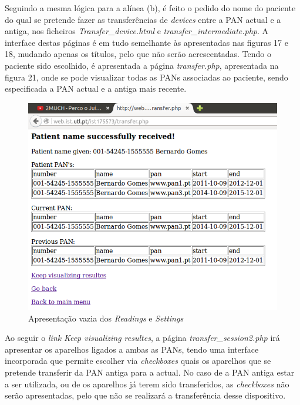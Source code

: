 \documentclass[a4paper]{article}
\begin{document}
\pagebreak
Seguindo a mesma lógica para a alínea (b), é feito o pedido do nome do paciente do qual se pretende fazer as transferências de \textit{devices} entre a PAN actual e a antiga, nos ficheiros \textit{Transfer\_device.html} e \textit{transfer\_intermediate.php}. A interface destas páginas é em tudo semelhante às apresentadas nas figuras 17 e 18, mudando apenas os títulos, pelo que não serão acrescentadas. Tendo o paciente sido escolhido, é apresentada a página \textit{transfer.php}, apresentada na figura 21, onde se pode visualizar todas as PANs associadas ao paciente, sendo especificada a PAN actual e a antiga mais recente.

\begin{figure}[ht!]
\centering
\includegraphics[scale=0.53]{transfer_php.png}
\caption{Apresentação vazia dos \textit{Readings} e \textit{Settings}}
\end{figure}
\vskip 9mm
Ao seguir o \textit{link} \textit{Keep visualizing resultes}, a página \textit{transfer\_session2.php} irá apresentar os aparelhos ligados a ambas as PANs, tendo uma interface incorporada que permite escolher via \textit{checkboxes} quais os aparelhos que se pretende transferir da PAN antiga para a actual. No caso de a PAN antiga estar a ser utilizada, ou de os aparelhos já terem sido transferidos, as \textit{checkboxes} não serão apresentadas, pelo que não se realizará a transferência desse dispositivo.
\end{document}
